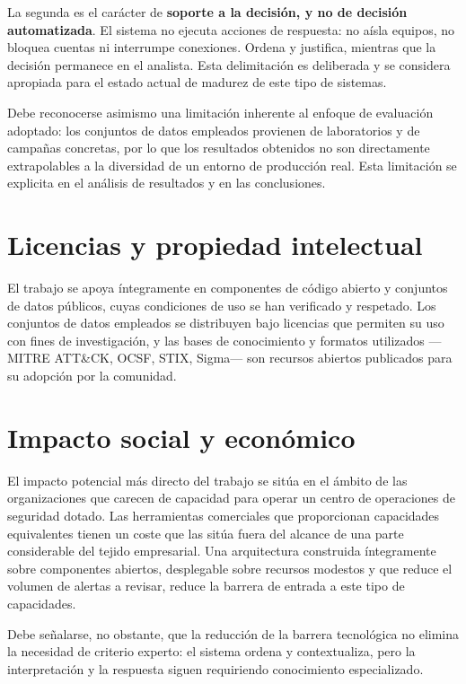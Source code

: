 La segunda es el carácter de \textbf{soporte a la decisión, y no de decisión automatizada}.
El sistema no ejecuta acciones de respuesta: no aísla equipos, no bloquea cuentas ni
interrumpe conexiones. Ordena y justifica, mientras que la decisión permanece en el analista.
Esta delimitación es deliberada y se considera apropiada para el estado actual de madurez de
este tipo de sistemas.

Debe reconocerse asimismo una limitación inherente al enfoque de evaluación adoptado: los
conjuntos de datos empleados provienen de laboratorios y de campañas concretas, por lo que
los resultados obtenidos no son directamente extrapolables a la diversidad de un entorno de
producción real. Esta limitación se explicita en el análisis de resultados y en las
conclusiones.

\section{Licencias y propiedad intelectual}

El trabajo se apoya íntegramente en componentes de código abierto y conjuntos de datos
públicos, cuyas condiciones de uso se han verificado y respetado. Los conjuntos de datos
empleados se distribuyen bajo licencias que permiten su uso con fines de investigación, y las
bases de conocimiento y formatos utilizados —MITRE ATT\&CK, OCSF, STIX, Sigma— son recursos
abiertos publicados para su adopción por la comunidad.


\section{Impacto social y económico}

El impacto potencial más directo del trabajo se sitúa en el ámbito de las organizaciones que
carecen de capacidad para operar un centro de operaciones de seguridad dotado. Las
herramientas comerciales que proporcionan capacidades equivalentes tienen un coste que las
sitúa fuera del alcance de una parte considerable del tejido empresarial. Una arquitectura
construida íntegramente sobre componentes abiertos, desplegable sobre recursos modestos y
que reduce el volumen de alertas a revisar, reduce la barrera de entrada a este tipo de
capacidades.

Debe señalarse, no obstante, que la reducción de la barrera tecnológica no elimina la
necesidad de criterio experto: el sistema ordena y contextualiza, pero la interpretación y la
respuesta siguen requiriendo conocimiento especializado.

